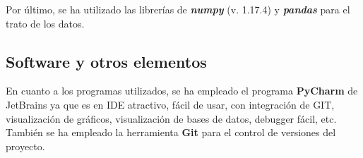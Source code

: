Por último, se ha utilizado las librerías de \textbf{\textit{numpy}} (v. 1.17.4) y \textbf{\textit{pandas}} para el trato de los datos. 

\subsection{Software y otros elementos} 

En cuanto a los programas utilizados, se ha empleado el programa \textbf{PyCharm} de JetBrains ya que es en IDE atractivo, fácil de usar, con integración de GIT, visualización de gráficos, visualización de bases de datos, debugger fácil, etc. \\

También se ha empleado la herramienta \textbf{Git} para el control de versiones del proyecto. 
